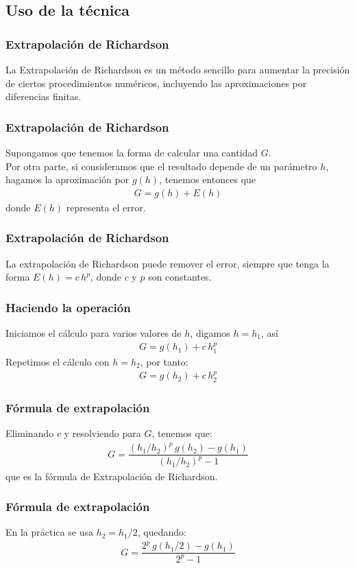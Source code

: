 \subsection{Uso de la técnica}
\begin{frame}
\frametitle{Extrapolación de Richardson}
La Extrapolación de Richardson es un método sencillo para aumentar la precisión de ciertos procedimientos numéricos, incluyendo las aproximaciones por diferencias finitas.
\end{frame}
\begin{frame}
\frametitle{Extrapolación de Richardson}
Supongamos que tenemos la forma de calcular una cantidad $G$.
\\
\bigskip
Por otra parte, si consideramos que el resultado depende de un parámetro $h$, hagamos la aproximación por $g(h)$, tenemos entonces que 
\begin{align*}
G = g(h) + E(h)
\end{align*}
donde $E(h)$ representa el error.
\end{frame}
\begin{frame}
\frametitle{Extrapolación de Richardson}
La extrapolación de Richardson puede remover el error, siempre que tenga la forma $E(h) = c \, h^{p}$, donde $c$ y $p$ son constantes.
\end{frame}
\begin{frame}
\frametitle{Haciendo la operación}
Iniciamos el cálculo para varios valores de $h$, digamos $h = h_{1}$, así
\begin{align*}
G = g(h_{1}) + c \, h_{1}^{p}
\end{align*}
\pause
Repetimos el cálculo con $h = h_{2}$, por tanto:
\begin{align*}
G = g(h_{2}) + c \, h_{2}^{p}
\end{align*}
\end{frame}
\begin{frame}
\frametitle{Fórmula de extrapolación}
Eliminando $c$ y resolviendo para $G$, tenemos que:
\begin{align*}
G = \dfrac{(h_{1}/h_{2})^{p} \, g(h_{2}) - g(h_{1})}{(h_{1}/h_{2})^{p}-1}
\end{align*}
que es la fórmula de Extrapolación de Richardson. 
\end{frame}
\begin{frame}
\frametitle{Fórmula de extrapolación}
En la práctica se usa $h_{2} = h_{1}/2$, quedando:
\begin{align*}
G = \dfrac{2^{p} \, g(h_{1}/2) - g(h_{1})}{2^{p}-1}
\end{align*}
\end{frame}
